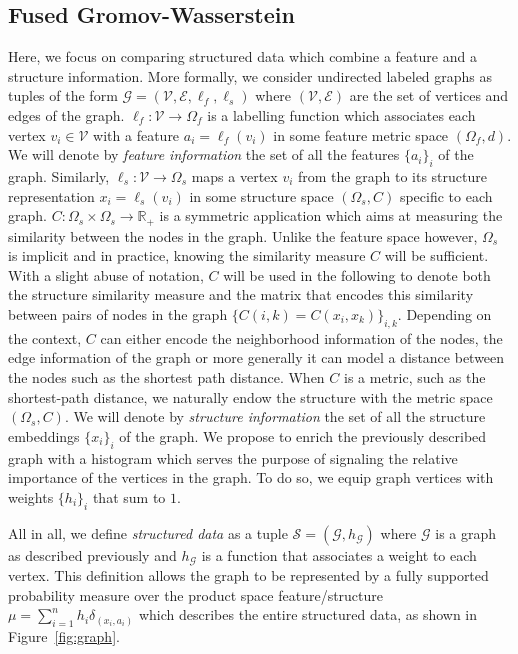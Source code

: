 
\subsection{Fused Gromov-Wasserstein}

Here, we focus on comparing structured data which combine a feature
and a structure information.
More formally, we consider undirected labeled graphs as tuples of the form $\mathcal{G}=(\mathcal{V},\mathcal{E},\ell_f,\ell_s)$ where
$(\mathcal{V},\mathcal{E})$ are the set of vertices and edges of the graph.
$\ell_f: \mathcal{V} \rightarrow \Omega_f$ is a labelling function which
associates each vertex $v_{i} \in \mathcal{V}$ with a feature
$a_{i} = \ell_f(v_{i})$ in some feature metric space
$(\Omega_f,d)$.
We will denote by \emph{feature information} the set of all the features
$\{a_{i}\}_{i}$ of the graph.
Similarly, $\ell_s: \mathcal{V} \rightarrow \Omega_s$ maps a vertex $v_i$ from
the graph to its structure representation
$x_{i} = \ell_s(v_{i})$ in some structure space
$(\Omega_s,C)$ specific to each graph.
$C : \Omega_s \times \Omega_s \rightarrow \mathbb{R_{+}}$ is a symmetric
application which aims at measuring the similarity between the nodes in the
graph.
Unlike the feature space however, $\Omega_s$ is implicit and in practice,
knowing the similarity measure $C$ will be sufficient. With a slight abuse of
notation, $C$ will be used in the following to denote both the structure
similarity measure and the matrix that encodes this similarity between pairs of
nodes in the graph $\{C(i,k) = C(x_i, x_k)\}_{i,k}$.
Depending on the context, $C$ can either encode the neighborhood information of
the nodes, the edge information of the graph or more generally it can model a
distance between the nodes such as the shortest path distance.
When $C$ is a metric, such as the shortest-path
distance, we naturally endow the structure with the metric space $(\Omega_s,C)$.
We will denote by \emph{structure information} the set of all the structure
embeddings $\{x_{i}\}_i$ of the graph.
We propose to enrich the previously described graph with a histogram which
serves the purpose of signaling the relative importance of the vertices in the
graph.
To do so, we equip graph vertices with weights $\{h_{i}\}_{i}$ that sum to $1$.

All in all, we define \emph{structured data} as a
tuple $\mathcal{S}=(\mathcal{G},h_{\mathcal{G}})$ where $\mathcal{G}$ is a
graph as described previously and $h_{\mathcal{G}}$ is a function that
associates a weight to each vertex. This definition allows the graph to be
represented by a fully supported probability measure over the product space
feature/structure $\mu= \sum_{i=1}^{n} h_{i} \delta_{(x_{i},a_{i})}$ which
describes the entire structured data, as shown in Figure~\ref{fig:graph}.

